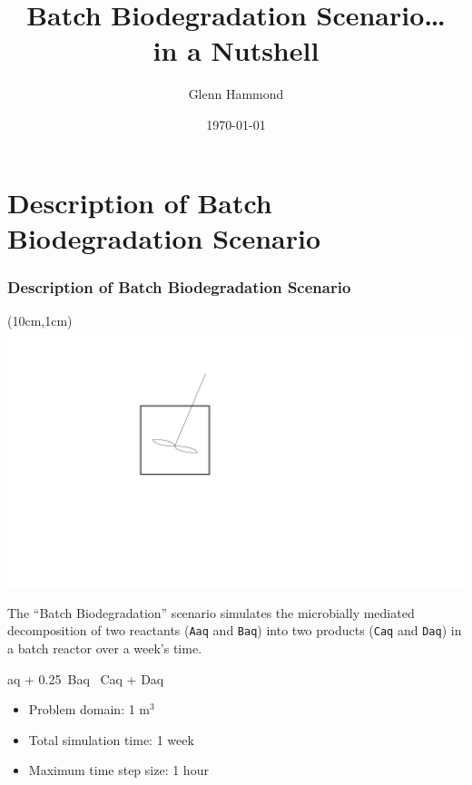 \documentclass{beamer}
\def\EQ#1\EN{\begin{equation*}#1\end{equation*}}
\begin{document}
\title{Batch Biodegradation Scenario\ldots\\in a Nutshell}
\author{Glenn Hammond}
\date{\today}

\frame{\titlepage}


\section{Description of Batch Biodegradation Scenario}

\begin{frame}\frametitle{Description of Batch Biodegradation Scenario}

\begin{textblock*}{5cm}(10cm,1cm) %
  \includegraphics[width=0.3\linewidth]{../../.shared_files/reactor_fig}
\end{textblock*}
\vspace{1cm}
The ``Batch Biodegradation'' scenario simulates the microbially mediated decomposition of two reactants (\verb|Aaq| and \verb|Baq|) into two products (\verb|Caq| and \verb|Daq|) in a batch reactor over a week's time.

\EQ
Aaq + 0.25\, Baq \, Caq + Daq
\EN

\begin{itemize}
  \item Problem domain: 1 m$^3$
  \item Total simulation time: 1 week
  \item Maximum time step size: 1 hour
\end{itemize}

\end{frame}
\end{document}
